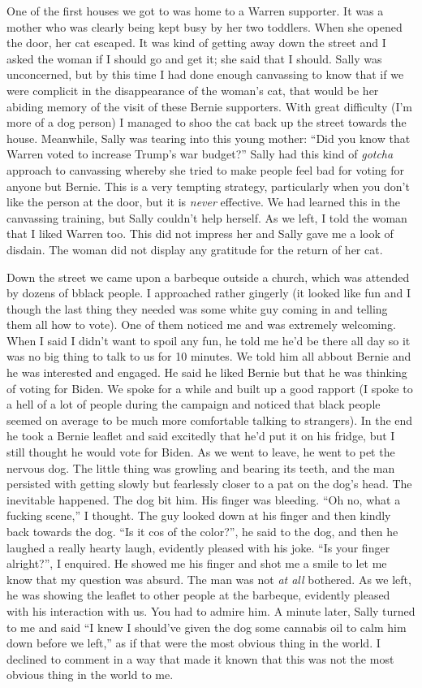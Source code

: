 \documentclass[]{book}
\begin{document}
One of the first houses we got to was home to a Warren supporter. It was a mother who was clearly being kept busy by her two toddlers. When she opened the door, her cat escaped. It was kind of getting away down the street and I asked the woman if I should go and get it; she said that I should. Sally was unconcerned, but by this time I had done enough canvassing to know that if we were complicit in the disappearance of the woman's cat, that would be her abiding memory of the visit of these Bernie supporters. With great difficulty (I'm more of a dog person) I managed to shoo the cat back up the street towards the house. Meanwhile, Sally was tearing into this young mother: ``Did you know that Warren voted to increase Trump's war budget?'' Sally had this kind of \emph{gotcha} approach to canvassing whereby she tried to make people feel bad for voting for anyone but Bernie. This is a very tempting strategy, particularly when you don't like the person at the door, but it is \emph{never} effective. We had learned this in the canvassing training, but Sally couldn't help herself. As we left, I told the woman that I liked Warren too. This did not impress her and Sally gave me a look of disdain. The woman did not display any gratitude for the return of her cat.

Down the street we came upon a barbeque outside a church, which was attended by dozens of bblack people. I approached rather gingerly (it looked like fun and I though the last thing they needed was some white guy coming in and telling them all how to vote). One of them noticed me and was extremely welcoming. When I said I didn't want to spoil any fun, he told me he'd be there all day so it was no big thing to talk to us for 10 minutes. We told him all abbout Bernie and he was interested and engaged. He said he liked Bernie but that he was thinking of voting for Biden. We spoke for a while and built up a good rapport (I spoke to a hell of a lot of people during the campaign and noticed that black people seemed on average to be much more comfortable talking to strangers). In the end he took a Bernie leaflet and said excitedly that he'd put it on his fridge, but I still thought he would vote for Biden. As we went to leave, he went to pet the nervous dog. The little thing was growling and bearing its teeth, and the man persisted with getting slowly but fearlessly closer to a pat on the dog's head. The inevitable happened. The dog bit him. His finger was bleeding. ``Oh no, what a fucking scene,'' I thought. The guy looked down at his finger and then kindly back towards the dog. ``Is it cos of the color?'', he said to the dog, and then he laughed a really hearty laugh, evidently pleased with his joke. ``Is your finger alright?'', I enquired. He showed me his finger and shot me a smile to let me know that my question was absurd. The man was not \emph{at all} bothered. As we left, he was showing the leaflet to other people at the barbeque, evidently pleased with his interaction with us. You had to admire him. A minute later, Sally turned to me and said ``I knew I should've given the dog some cannabis oil to calm him down before we left,'' as if that were the most obvious thing in the world. I declined to comment in a way that made it known that this was not the most obvious thing in the world to me.
\end{document}
